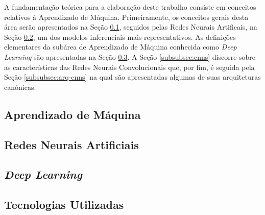 
A fundamentação teórica para a elaboração deste trabalho consiste em conceitos relativos à Aprendizado de Máquina. Primeiramente, os conceitos gerais desta área serão apresentados na Seção \ref{subsec:ml}, seguidos pelas Redes Neurais Artificais, na Seção \ref{subsec:rna}, um dos modelos inferenciais mais representativos.
As definições elementares da subárea de Aprendizado de Máquina conhecida como \emph{Deep Learning} são apresentadas na Seção \ref{subsec:dl}. A Seção \ref{subsubsec:cnns} discorre sobre as características das Redes Neurais Convolucionais que, por fim, é seguida pela Seção \ref{subsubsec:arq-cnns} na qual são apresentadas algumas de suas arquiteturas canônicas.


\subsection{Aprendizado de Máquina}
\label{subsec:ml}


\subsection{Redes Neurais Artificiais}
\label{subsec:rna}


\subsection{\emph{Deep Learning}}
\label{subsec:dl}


\subsection{Tecnologias Utilizadas}
\label{subsec:tecnologias}

